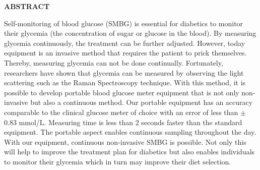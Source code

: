 {}

\begin{center}
    \large{\bf ABSTRACT}
\end{center}

\begin{sloppypar}
Self-monitoring of blood glucose (SMBG) is essential for diabetics to monitor their glycemia (the concentration of sugar or glucose in the blood). By measuring glycemia continuously, the treatment can be further adjusted.
However, today equipment is an invasive method that requires the patient to prick themselves.
Thereby, measuring glycemia can not be done continually. 
Fortunately, researchers have shown that glycemia can be measured by observing the light scattering such as the Raman Spectroscopy technique. 
With this method, it is possible to develop portable blood glucose meter equipment that is not only non-invasive but also a continuous method.  
Our portable equipment has an accuracy comparable to the clinical glucose meter of choice with an error of less than $\pm$ 0.83 mmol/L. 
Measuring time is less than 2 seconds faster than the standard equipment. 
The portable aspect enables continuous sampling throughout the day. 
With our equipment, continuous non-invasive SMBG is possible. 
Not only this will help to improve the treatment plan for diabetics but also enables individuals to monitor their glycemia which in turn may improve their diet selection.
\end{sloppypar}

